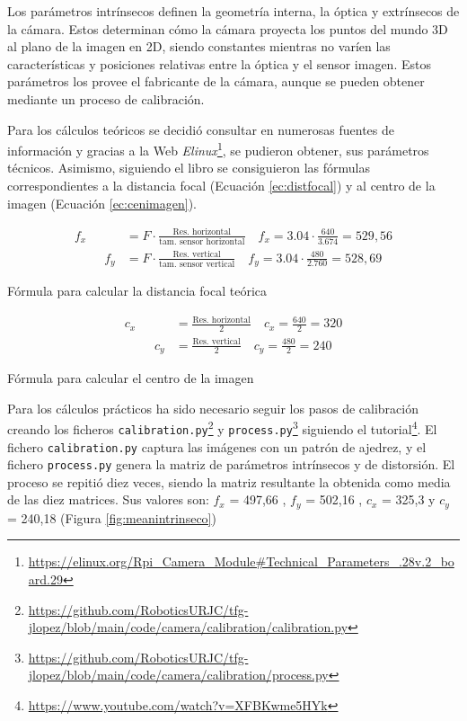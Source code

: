Los parámetros intrínsecos definen la geometría interna, la óptica y extrínsecos de la cámara. Estos determinan cómo la cámara proyecta los puntos del mundo 3D al plano de la imagen en 2D, siendo constantes mientras no varíen las características y posiciones relativas entre la óptica y el sensor imagen. Estos parámetros los provee el fabricante de la cámara, aunque se pueden obtener mediante un proceso de calibración.

Para los cálculos teóricos se decidió consultar en numerosas fuentes de información y gracias a la Web \textit{Elinux}\footnote{\url{https://elinux.org/Rpi_Camera_Module\#Technical_Parameters_.28v.2_board.29}}, se pudieron obtener, sus parámetros técnicos. Asimismo, siguiendo el libro \cite{Hartley2004} se consiguieron las fórmulas correspondientes a la distancia focal (Ecuación \ref{ec:distfocal}) y al centro de la imagen (Ecuación \ref{ec:cenimagen}).


\begin{myequation}[h]
	\begin{align}
		f_x &= F \cdot \frac{\text{Res. horizontal}}{\text{tam. sensor horizontal}} \quad
		f_x = 3.04 \cdot \frac{640}{3.674} = 529,56 \\
		\hspace{1cm}
		f_y &= F \cdot \frac{\text{Res. vertical}}{\text{tam. sensor vertical}} \quad
		f_y = 3.04 \cdot \frac{480}{2.760} = 528,69
	\end{align}
	\caption[Fórmula para calcular la distancia focal teórica]{Fórmula para calcular la distancia focal teórica}
	\label{ec:distfocal}
\end{myequation}

\begin{myequation}[h]
	\begin{align}
		c_x &= \frac{\text{Res. horizontal}}{2} \quad
		c_x = \frac{640}{2} = 320 \\
		\hspace{1cm}
		c_y &= \frac{\text{Res. vertical}}{2} \quad
		c_y =  \frac{480}{2} = 240
	\end{align}
	\caption[Fórmula para calcular el centro de la imagen]{Fórmula para calcular el centro de la imagen}
	\label{ec:cenimagen}
\end{myequation}

Para los cálculos prácticos ha sido necesario seguir los pasos de calibración creando los ficheros \verb|calibration.py|\footnote{\url{https://github.com/RoboticsURJC/tfg-jlopez/blob/main/code/camera/calibration/calibration.py}} y \verb|process.py|\footnote{\url{https://github.com/RoboticsURJC/tfg-jlopez/blob/main/code/camera/calibration/process.py}} siguiendo el tutorial\footnote{\url{https://www.youtube.com/watch?v=XFBKwme5HYk}}. El fichero \verb|calibration.py| captura las imágenes con un patrón de ajedrez, y el fichero \verb|process.py| genera la matriz de parámetros intrínsecos y de distorsión. El proceso se repitió diez veces, siendo la matriz resultante la obtenida como media de las diez matrices. Sus valores son: $f_x$ = 497,66 , $f_y$ = 502,16 , $c_x$ = 325,3 y $c_y$ = 240,18 (Figura \ref{fig:meanintrinseco})

